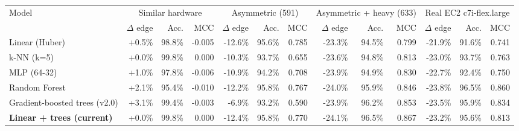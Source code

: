 \begin{tabular}{lrrrrrrrrrrrr}
\toprule
Model & \multicolumn{3}{c}{Similar hardware} & \multicolumn{3}{c}{Asymmetric (591)} & \multicolumn{3}{c}{Asymmetric + heavy (633)} & \multicolumn{3}{c}{Real EC2 c7i-flex.large} \\
 & $\Delta$ edge & Acc. & MCC & $\Delta$ edge & Acc. & MCC & $\Delta$ edge & Acc. & MCC & $\Delta$ edge & Acc. & MCC \\
\midrule
Linear (Huber) & +0.5\% & 98.8\% & -0.005 & -12.6\% & 95.6\% & 0.785 & -23.3\% & 94.5\% & 0.799 & -21.9\% & 91.6\% & 0.741 \\
k-NN (k=5) & +0.0\% & 99.8\% & 0.000 & -10.3\% & 93.7\% & 0.655 & -23.6\% & 94.8\% & 0.813 & -23.0\% & 93.7\% & 0.763 \\
MLP (64-32) & +1.0\% & 97.8\% & -0.006 & -10.9\% & 94.2\% & 0.708 & -23.9\% & 94.9\% & 0.830 & -22.7\% & 92.4\% & 0.750 \\
Random Forest & +2.1\% & 95.4\% & -0.010 & -12.2\% & 95.8\% & 0.767 & -24.0\% & 95.9\% & 0.846 & -23.8\% & 96.5\% & 0.860 \\
Gradient-boosted trees (v2.0) & +3.1\% & 99.4\% & -0.003 & -6.9\% & 93.2\% & 0.590 & -23.9\% & 96.2\% & 0.853 & -23.5\% & 95.9\% & 0.834 \\
\textbf{Linear + trees (current)} & +0.0\% & 99.8\% & 0.000 & -12.4\% & 95.8\% & 0.770 & -24.1\% & 96.5\% & 0.867 & -23.2\% & 95.6\% & 0.813 \\
\bottomrule
\end{tabular}
